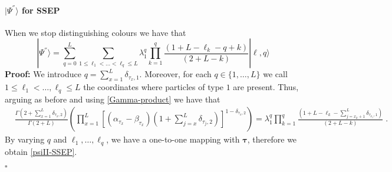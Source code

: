 \documentclass[10pt]{article}
\numberwithin{equation}{section}
\numberwithin{equation}{subsection}
\newcommand{\dt}{\;.}
\begin{document}
\paragraph{$|\Psi^{''}\rangle$ for SSEP} When we stop distinguishing colours we have that 
\begin{equation}\label{psiII-SSEP}
	|\Psi^{''}\rangle=\sum_{q=0}^{L}\sum_{1\leq \ell_{1}<\ldots<\ell_{q}\leq L}\lambda_{1}^{q}\prod_{k=1}^{q}\frac{\left(1+L-\ell_{k}-q+k\right)}{(2+L-k)}|\bm{\ell},q\rangle
\end{equation}
\textbf{Proof:} 
We introduce $q=\sum_{x=1}^{L}\delta_{\tau_{x},1}$. Moreover, for each $q\in \{1,\ldots,L\}$ we call $1\leq\ell_{1}<\ldots,\ell_{q}\leq L$ the coordinates where particles of type $1$ are present. Thus, arguing as before and using \eqref{Gamma-product} we have that 
\begin{align}
	&\frac{\Gamma\left(2+\sum_{x=1}^{L}\delta_{\tau_{x},2}\right)}{\Gamma\left(2+L\right)}\left(\prod_{x=1}^{L}\left[(\alpha_{\tau_{x}}-\beta_{\tau_{x}})\left(1+\sum_{j=x}^{L}\delta_{\tau_{j},2}\right)\right]^{1-\delta_{\tau_{x},2}}\right)%
	=\lambda_{1}^{q}\prod_{k=1}^{q}\frac{\left(1+L-\ell_{k}-\sum_{j=x_{k}+1}^{L}\delta_{\tau_{x_{j}},1}\right)}{(2+L-k)}\dt
\end{align}
By varying $q$ and $\ell_{1},\ldots,\ell_{q}$, we have a one-to-one mapping with $\bm{\tau}$, therefore we obtain \eqref{psiII-SSEP}.
\begin{flushright}
	$\square$
\end{flushright}
\end{document}
